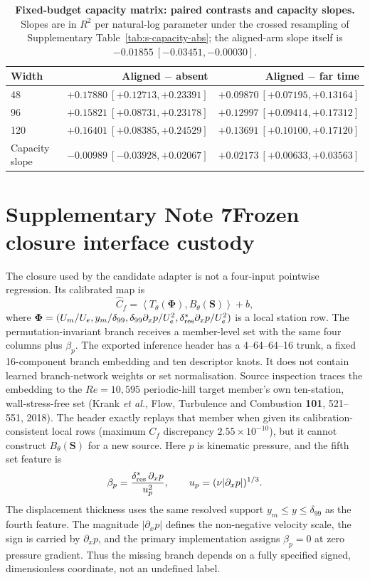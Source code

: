 \documentclass[11pt]{article}
\begin{document}
\begin{table}[h]
\centering
\footnotesize
\setlength{\tabcolsep}{4pt}
\begin{tabular}{@{}lrr@{}}
\toprule
Width & Aligned $-$ absent & Aligned $-$ far time \\
\midrule
48 & $+0.17880\ [+0.12713,+0.23391]$ & $+0.09870\ [+0.07195,+0.13164]$ \\
96 & $+0.15821\ [+0.08731,+0.23178]$ & $+0.12997\ [+0.09414,+0.17312]$ \\
120 & $+0.16401\ [+0.08385,+0.24529]$ & $+0.13691\ [+0.10100,+0.17120]$ \\
Capacity slope & $-0.00989\ [-0.03928,+0.02067]$ & $+0.02173\ [+0.00633,+0.03563]$ \\
\bottomrule
\end{tabular}
\caption{\textbf{Fixed-budget capacity matrix: paired contrasts and capacity slopes.} Slopes are
in $R^2$ per natural-log parameter under the crossed resampling of
Supplementary Table~\ref{tab:s-capacity-abs}; the aligned-arm slope itself is
$-0.01855\ [-0.03451,-0.00030]$.}\label{tab:s-capacity-gain}
\end{table}

\section*{Supplementary Note 7\quad Frozen closure interface custody}\label{sec:s-closure-custody}

The closure used by the candidate adapter is not a four-input pointwise regression. Its calibrated
map is
\[
\widehat C_f=\left\langle T_\theta(\boldsymbol\Phi),
B_\theta(\mathbf S)\right\rangle+b ,
\]
where
$\boldsymbol\Phi=(U_m/U_e,y_m/\delta_{99},
\delta_{99}\partial_xp/U_e^2,\delta^\ast_{\rm res}\partial_xp/U_e^2)$
is a local station row. The permutation-invariant branch receives a member-level set with the
same four columns plus $\beta_p$. The exported inference header has a 4--64--64--16 trunk, a
fixed 16-component branch embedding and ten descriptor knots. It does not contain learned
branch-network weights or set normalisation. Source inspection traces the embedding to the
$Re=10{,}595$ periodic-hill target member's own ten-station, wall-stress-free set
(Krank \emph{et al.}, Flow, Turbulence and Combustion \textbf{101}, 521--551, 2018). The header exactly replays
that member when given its calibration-consistent local rows (maximum $C_f$ discrepancy
$2.55\times10^{-10}$), but it cannot construct $B_\theta(\mathbf S)$ for a new source.
Here \(p\) is kinematic pressure, and the fifth set feature is
\[
\beta_p=\frac{\delta^\ast_{\rm res}\,\partial_xp}{u_p^2},\qquad
u_p=(\nu|\partial_xp|)^{1/3}.
\]
The displacement thickness uses the same resolved support
\(y_m\leq y\leq\delta_{99}\) as the fourth feature. The magnitude
\(|\partial_xp|\) defines the non-negative velocity scale, the sign is carried by
\(\partial_xp\), and the primary implementation assigns \(\beta_p=0\) at zero pressure
gradient. Thus the missing branch depends on a fully specified signed, dimensionless coordinate,
not an undefined label.
\end{document}
